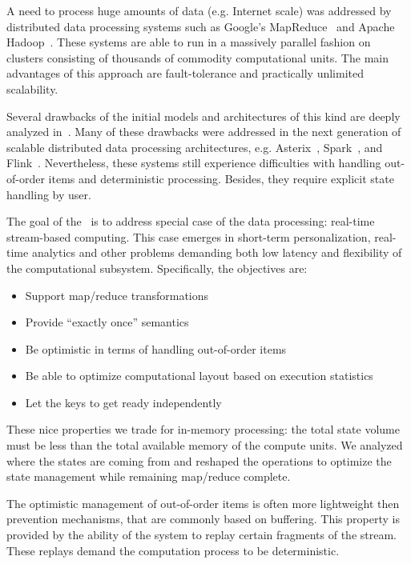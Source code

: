 
\label {fs-intro-seciton}

A need to process huge amounts of data (e.g. Internet scale) was addressed by distributed data processing systems such as Google's MapReduce~\cite{Dean:2008:MSD:1327452.1327492} and Apache Hadoop~\cite{hadoop2009hadoop}. These systems are able to run in a massively parallel fashion on clusters consisting of thousands of commodity computational units. The main advantages of this approach are fault-tolerance and practically unlimited scalability.

Several drawbacks of the initial models and architectures of this kind are deeply analyzed in~\cite{Doulkeridis:2014:SLA:2628707.2628782}. Many of these drawbacks were addressed in the next generation of scalable distributed data processing architectures, e.g. Asterix~\cite{Alsubaiee:2012:ASW:2331801.2331803}, Spark~\cite{Zaharia:2016:ASU:3013530.2934664}, and Flink~\cite{carbone2015apache}. Nevertheless, these systems still experience difficulties with handling out-of-order items and deterministic processing. Besides, they require explicit state handling by user.  

The goal of the \FlameStream\ is to address special case of the data processing: real-time stream-based computing. This case emerges in short-term personalization, real-time analytics and other problems demanding both low latency and flexibility of the computational subsystem. Specifically, the objectives are:

\begin {itemize}
\item Support map/reduce transformations
\item Provide ``exactly once'' semantics
\item Be optimistic in terms of handling out-of-order items
\item Be able to optimize computational layout based on execution statistics
\item Let the keys to get ready independently
\end {itemize}

These nice properties we trade for in-memory processing: the total state volume must be less than the total available memory of the compute units. We analyzed where the states are coming from and reshaped the operations to optimize the state management while remaining map/reduce complete. 

The optimistic management of out-of-order items is often more lightweight then prevention mechanisms, that are commonly based on buffering. This property is provided by the ability of the system to replay certain fragments of the stream. These replays demand the computation process to be deterministic. 

